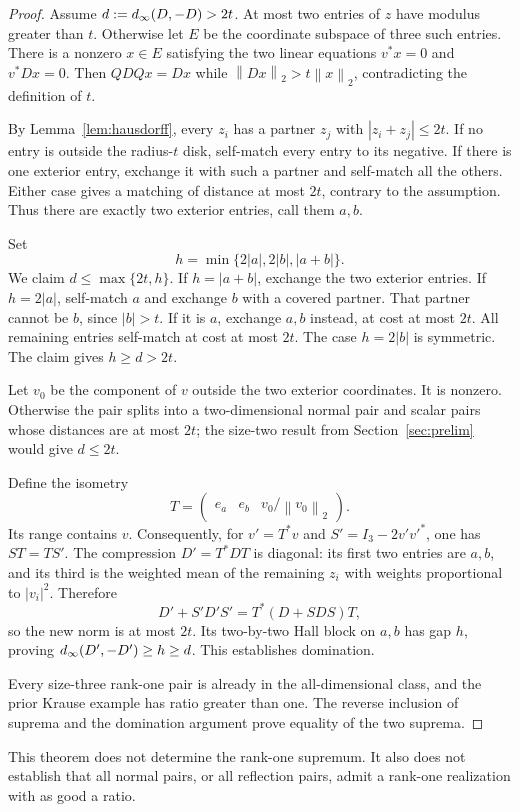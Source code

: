 \documentclass[11pt,letterpaper]{article}
\theoremstyle{remark}\newtheorem{remark}[theorem]{Remark}
\newcommand{\norm}[1]{\left\lVert#1\right\rVert_2}\newcommand{\abs}[1]{\left|#1\right|}\newcommand{\diag}{\operatorname{diag}}\newcommand{\rank}{\operatorname{rank}}
\begin{document}
\begin{proof}
Assume $d:=d_{\infty}(D,-D)>2t$. At most two entries of $z$ have modulus greater than $t$. Otherwise let $E$ be the coordinate subspace of three such entries. There is a nonzero $x\in E$ satisfying the two linear equations $v^*x=0$ and $v^*Dx=0$. Then $QDQx=Dx$ while $\norm{Dx}>t\norm{x}$, contradicting the definition of $t$.

By Lemma~\ref{lem:hausdorff}, every $z_i$ has a partner $z_j$ with $|z_i+z_j|\le2t$. If no entry is outside the radius-$t$ disk, self-match every entry to its negative. If there is one exterior entry, exchange it with such a partner and self-match all the others. Either case gives a matching of distance at most $2t$, contrary to the assumption. Thus there are exactly two exterior entries, call them $a,b$.

Set
\[
 h=\min\{2|a|,2|b|,|a+b|\}.
\]
We claim $d\le\max\{2t,h\}$. If $h=|a+b|$, exchange the two exterior entries. If $h=2|a|$, self-match $a$ and exchange $b$ with a covered partner. That partner cannot be $b$, since $|b|>t$. If it is $a$, exchange $a,b$ instead, at cost at most $2t$. All remaining entries self-match at cost at most $2t$. The case $h=2|b|$ is symmetric. The claim gives $h\ge d>2t$.

Let $v_0$ be the component of $v$ outside the two exterior coordinates. It is nonzero. Otherwise the pair splits into a two-dimensional normal pair and scalar pairs whose distances are at most $2t$; the size-two result from Section~\ref{sec:prelim} would give $d\le2t$.

Define the isometry
\[
T=\begin{pmatrix}e_a&e_b&v_0/\norm{v_0}\end{pmatrix}.
\]
Its range contains $v$. Consequently, for $v'=T^*v$ and $S'=I_3-2v'v'^*$, one has $ST=TS'$. The compression $D'=T^*DT$ is diagonal: its first two entries are $a,b$, and its third is the weighted mean of the remaining $z_i$ with weights proportional to $|v_i|^2$. Therefore
\begin{equation}\label{eq:rankonecompression}
D'+S'D'S'=T^*(D+SDS)T,
\end{equation}
so the new norm is at most $2t$. Its two-by-two Hall block on $a,b$ has gap $h$, proving $d_{\infty}(D',-D')\ge h\ge d$. This establishes domination.

Every size-three rank-one pair is already in the all-dimensional class, and the prior Krause example has ratio greater than one. The reverse inclusion of suprema and the domination argument prove equality of the two suprema.
\end{proof}
This theorem does not determine the rank-one supremum. It also does not establish that all normal pairs, or all reflection pairs, admit a rank-one realization with as good a ratio.
\end{document}

